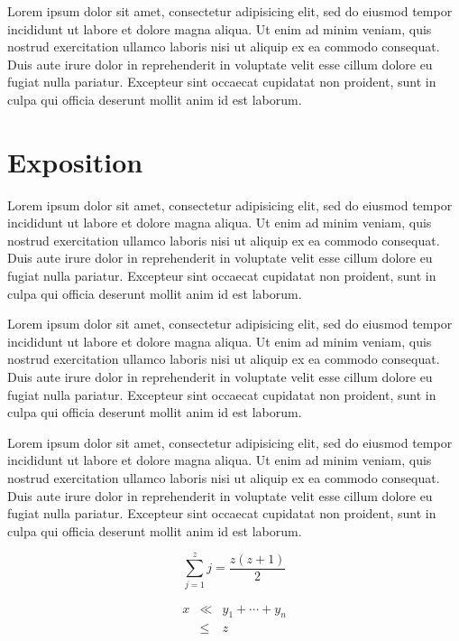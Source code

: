 \documentclass[review]{acmsiggraph}
\begin{document}
Lorem ipsum dolor sit amet, consectetur adipisicing elit, sed do
eiusmod tempor incididunt ut labore et dolore magna aliqua. Ut enim ad
minim veniam, quis nostrud exercitation ullamco laboris nisi ut
aliquip ex ea commodo consequat. Duis aute irure dolor in
reprehenderit in voluptate velit esse cillum dolore eu fugiat nulla
pariatur. Excepteur sint occaecat cupidatat non proident, sunt in
culpa qui officia deserunt mollit anim id est laborum.

\section{Exposition}

Lorem ipsum dolor sit amet, consectetur adipisicing elit, sed do
eiusmod tempor incididunt ut labore et dolore magna aliqua. Ut enim ad
minim veniam, quis nostrud exercitation ullamco laboris nisi ut
aliquip ex ea commodo consequat. Duis aute irure dolor in
reprehenderit in voluptate velit esse cillum dolore eu fugiat nulla
pariatur. Excepteur sint occaecat cupidatat non proident, sunt in
culpa qui officia deserunt mollit anim id est laborum.

Lorem ipsum dolor sit amet, consectetur adipisicing elit, sed do
eiusmod tempor incididunt ut labore et dolore magna aliqua. Ut enim ad
minim veniam, quis nostrud exercitation ullamco laboris nisi ut
aliquip ex ea commodo consequat. Duis aute irure dolor in
reprehenderit in voluptate velit esse cillum dolore eu fugiat nulla
pariatur. Excepteur sint occaecat cupidatat non proident, sunt in
culpa qui officia deserunt mollit anim id est laborum.

Lorem ipsum dolor sit amet, consectetur adipisicing elit, sed do
eiusmod tempor incididunt ut labore et dolore magna aliqua. Ut enim ad
minim veniam, quis nostrud exercitation ullamco laboris nisi ut
aliquip ex ea commodo consequat. Duis aute irure dolor in
reprehenderit in voluptate velit esse cillum dolore eu fugiat nulla
pariatur. Excepteur sint occaecat cupidatat non proident, sunt in
culpa qui officia deserunt mollit anim id est laborum.

\begin{equation}
 \sum_{j=1}^{z} j = \frac{z(z+1)}{2}
\end{equation}

\begin{eqnarray}
x & \ll & y_{1} + \cdots + y_{n} \\
  & \leq & z
\end{eqnarray}
\end{document}
